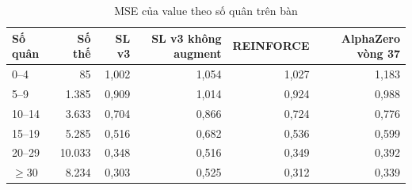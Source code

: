 \begin{table}[H]
  \centering
  \footnotesize
  \caption{MSE của value theo số quân trên bàn}
  \label{tab:cs-mang-giaidoan-mse}
  \begin{tabular}{lrrrrr}
    \toprule
    Số quân & Số thế & SL v3 & SL v3 không augment & REINFORCE & AlphaZero vòng 37 \\
    \midrule
    0--4 & 85 & 1,002 & 1,054 & 1,027 & 1,183 \\
    5--9 & 1.385 & 0,909 & 1,014 & 0,924 & 0,988 \\
    10--14 & 3.633 & 0,704 & 0,866 & 0,724 & 0,776 \\
    15--19 & 5.285 & 0,516 & 0,682 & 0,536 & 0,599 \\
    20--29 & 10.033 & 0,348 & 0,516 & 0,349 & 0,392 \\
    $\ge 30$ & 8.234 & 0,303 & 0,525 & 0,312 & 0,339 \\
    \bottomrule
  \end{tabular}
\end{table}
